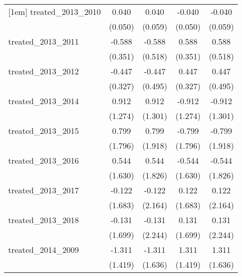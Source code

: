 {\begin{tabular}{l*{4}{c}}
[1em]
treated\_2013\_2010&       0.040         &       0.040         &      -0.040         &      -0.040         \\
            &     (0.050)         &     (0.059)         &     (0.050)         &     (0.059)         \\
[1em]
treated\_2013\_2011&      -0.588         &      -0.588         &       0.588         &       0.588         \\
            &     (0.351)         &     (0.518)         &     (0.351)         &     (0.518)         \\
[1em]
treated\_2013\_2012&      -0.447         &      -0.447         &       0.447         &       0.447         \\
            &     (0.327)         &     (0.495)         &     (0.327)         &     (0.495)         \\
[1em]
treated\_2013\_2014&       0.912         &       0.912         &      -0.912         &      -0.912         \\
            &     (1.274)         &     (1.301)         &     (1.274)         &     (1.301)         \\
[1em]
treated\_2013\_2015&       0.799         &       0.799         &      -0.799         &      -0.799         \\
            &     (1.796)         &     (1.918)         &     (1.796)         &     (1.918)         \\
[1em]
treated\_2013\_2016&       0.544         &       0.544         &      -0.544         &      -0.544         \\
            &     (1.630)         &     (1.826)         &     (1.630)         &     (1.826)         \\
[1em]
treated\_2013\_2017&      -0.122         &      -0.122         &       0.122         &       0.122         \\
            &     (1.683)         &     (2.164)         &     (1.683)         &     (2.164)         \\
[1em]
treated\_2013\_2018&      -0.131         &      -0.131         &       0.131         &       0.131         \\
            &     (1.699)         &     (2.244)         &     (1.699)         &     (2.244)         \\
[1em]
treated\_2014\_2009&      -1.311         &      -1.311         &       1.311         &       1.311         \\
            &     (1.419)         &     (1.636)         &     (1.419)         &     (1.636)         \\

\end{tabular}}
